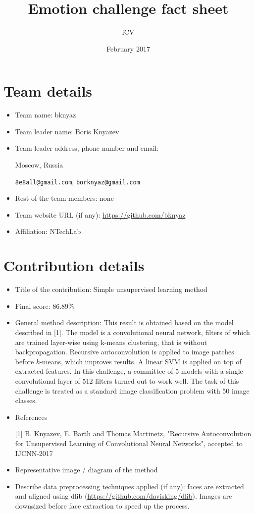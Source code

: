 \documentclass{article}
\title{Emotion challenge fact sheet}
\author{iCV}
\date{February 2017}
\begin{document}
\maketitle

\section{Team details}

\begin{itemize}
\item Team name: bknyaz                                  
\item Team leader name: Boris Knyazev                           
\item Team leader address, phone number and email: 

Moscow, Russia

\texttt{8e8all@gmail.com}, \texttt{borknyaz@gmail.com}

\item Rest of the team members: none                    
\item Team website URL (if any): \url{https://github.com/bknyaz}
\item Affiliation: NTechLab
\end{itemize}

\section{Contribution details}

\begin{itemize}
\item Title of the contribution: Simple unsupervised learning method
\item Final score: 86.89\%                                              
\item General method description: This result is obtained based on the model described in [1]. The model is a convolutional neural network, filters of which are trained layer-wise using k-means clustering, that is without backpropagation. Recursive autoconvolution is applied to image patches before $k$-means, which improves results. A linear SVM is applied on top of extracted features. In this challenge, a committee of 5 models with a single convolutional layer of 512 filters turned out to work well.
The task of this challenge is treated as a standard image classification problem with 50 image classes.

\item References

[1] B. Knyazev, E. Barth and Thomas Martinetz, "Recursive Autoconvolution for Unsupervised Learning of Convolutional Neural Networks", accepted to IJCNN-2017
\item Representative image / diagram of the method        
\item Describe data preprocessing techniques applied (if any): faces are extracted and aligned using dlib (\url{https://github.com/davisking/dlib}). Images are downsized before face extraction to speed up the process.
\end{itemize}
\end{document}
